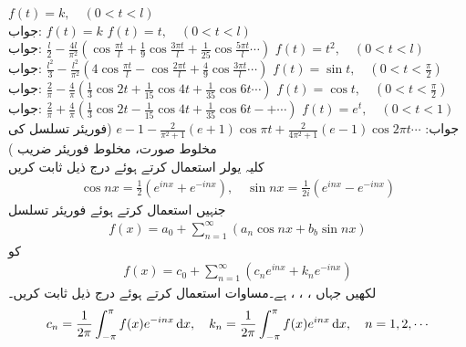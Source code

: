 \quad
$f(t)=k,\quad (0<t<l)$\\
جواب:\quad
$f(t)=k$
\quad
$f(t)=t,\quad (0<t<l)$\\
جواب:\quad
$\tfrac{l}{2}-\tfrac{4l}{\pi^2}(\cos \tfrac{\pi t}{l}+\tfrac{1}{9}\cos \tfrac{3\pi t}{l}+\tfrac{1}{25}\cos \tfrac{5\pi t}{l}\cdots)$
\quad
$f(t)=t^2,\quad (0<t<l)$\\
جواب:\quad
$\tfrac{l^2}{3}-\tfrac{l^2}{\pi^2}(4\cos \tfrac{\pi t}{l}-\cos \tfrac{2\pi t}{l}+\tfrac{4}{9}\cos \tfrac{3\pi t}{l}\cdots)$
\quad
$f(t)=\sin t,\quad (0<t<\tfrac{\pi}{2})$\\
جواب:\quad
$\tfrac{2}{\pi}-\tfrac{4}{\pi}(\tfrac{1}{3}\cos 2t+\tfrac{1}{15}\cos 4t+\tfrac{1}{35}\cos 6t\cdots)$
\quad
$f(t)=\cos t,\quad (0<t<\tfrac{\pi}{2})$\\
جواب:\quad
$\tfrac{2}{\pi}+\tfrac{4}{\pi}(\tfrac{1}{3}\cos 2t-\tfrac{1}{15}\cos 4t+\tfrac{1}{35}\cos 6t-+\cdots)$
\quad
$f(t)=e^t,\quad (0<t<1)$\\
جواب:\quad
$e-1-\tfrac{2}{\pi^2+1}(e+1)\cos \pi t+\tfrac{2}{4\pi^2+1}(e-1)\cos 2\pi t\cdots$
\quad (فوریئر تسلسل کی مخلوط صورت، مخلوط فوریئر  ضریب )\\
کلیہ یولر   استعمال کرتے ہوئے درج ذیل ثابت کریں
\begin{align*}
\cos nx=\frac{1}{2}(e^{inx}+e^{-inx}),\quad \sin nx=\frac{1}{2i}(e^{inx}-e^{-inx})
\end{align*}
جنہیں استعمال کرتے ہوئے فوریئر تسلسل
\begin{align*}
f(x)=a_0+\sum_{n=1}^{\infty} (a_n\cos nx+b_b\sin nx)
\end{align*}
کو
\begin{align}\label{مساوات_فوریئر_مخلوط_الف}
f(x)=c_0+\sum_{n=1}^{\infty}(c_ne^{inx}+k_ne^{-inx})
\end{align}
لکھیں جہاں ، ، ،  ہے۔مساوات  استعمال کرتے ہوئے درج ذیل ثابت کریں۔
\begin{align*}
c_n=\frac{1}{2\pi}\int_{-\pi}^{\pi} f(x)e^{-inx}\dif x,\quad k_n=\frac{1}{2\pi}\int_{-\pi}^{\pi} f(x)e^{inx}\dif x,\quad n=1,2,\cdots
\end{align*}

